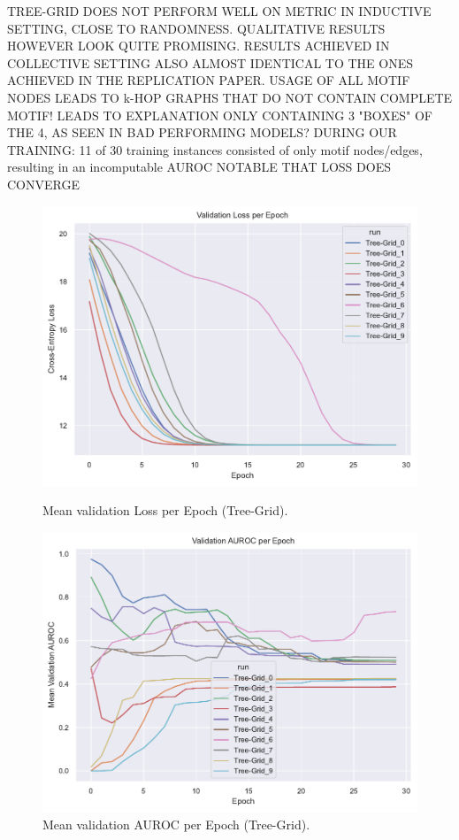 TREE-GRID DOES NOT PERFORM WELL ON METRIC IN INDUCTIVE SETTING, CLOSE TO RANDOMNESS. QUALITATIVE RESULTS HOWEVER LOOK QUITE PROMISING. RESULTS ACHIEVED IN COLLECTIVE SETTING ALSO ALMOST IDENTICAL TO THE ONES ACHIEVED IN THE REPLICATION PAPER. USAGE OF ALL MOTIF NODES LEADS TO k-HOP GRAPHS THAT DO NOT CONTAIN COMPLETE MOTIF! LEADS TO EXPLANATION ONLY CONTAINING 3 "BOXES" OF THE 4, AS SEEN IN BAD PERFORMING MODELS?
DURING OUR TRAINING: 11 of 30 training instances consisted of only motif nodes/edges, resulting in an incomputable AUROC
NOTABLE THAT LOSS DOES CONVERGE 

\begin{figure}[htbp]
    \centering
    \begin{minipage}{0.48\textwidth}
        \centering
        \includegraphics[width=\textwidth]{img/plots/Grid_val_loss_plot.pdf}  %
        \caption{Mean validation Loss per Epoch (Tree-Grid).}
        \label{fig:Tree-Grid-val_loss}
    \end{minipage}
    \hfill
    \begin{minipage}{0.48\textwidth}
        \centering
        \includegraphics[width=\textwidth]{img/plots/Grid_val_auroc_plot.pdf}  %
        \caption{Mean validation AUROC per Epoch (Tree-Grid).}
        \label{fig:Tree-Grid-val_auroc}
    \end{minipage}
\end{figure}

